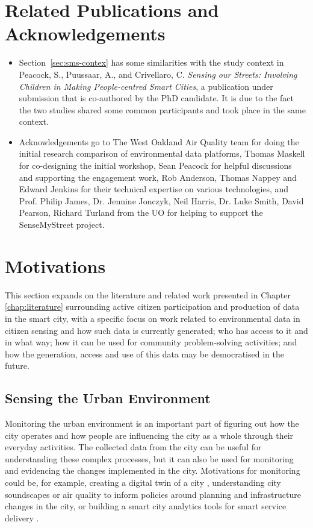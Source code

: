 \section*{Related Publications and Acknowledgements}
\begin{itemize}
\item Section~\ref{sec:sms-contex} has some similarities with the study context in Peacock, S., Puussaar, A., and Crivellaro, C. \textit{Sensing our Streets: Involving Children in Making People-centred Smart Cities}, a publication under submission that is co-authored by the PhD candidate. It is due to the fact the two studies shared some common participants and took place in the same context.
\item Acknowledgements go to The West Oakland Air Quality team for doing the initial research comparison of environmental data platforms, Thomas Maskell for co-designing the initial workshop, Sean Peacock for helpful discussions and supporting the engagement work, Rob Anderson, Thomas Nappey and Edward Jenkins for their technical expertise on various technologies, and Prof. Philip James, Dr. Jennine Jonczyk, Neil Harris, Dr. Luke Smith, David Pearson, Richard Turland from the UO for helping to support the SenseMyStreet project.
\end{itemize}
\clearpage

\section{Motivations}
\label{sec:sms_mod}
This section expands on the literature and related work presented in Chapter \ref{chap:literature} surrounding active citizen participation and production of data in the smart city, with a specific focus on work related to environmental data in citizen sensing and how such data is currently generated; who has access to it and in what way; how it can be used for community problem-solving activities; and how the generation, access and use of this data may be democratised in the future.

\subsection{Sensing the Urban Environment}
Monitoring the urban environment is an important part of figuring out how the city operates and how people are influencing the city as a whole through their everyday activities. The collected data from the city can be useful for understanding these complex processes, but it can also be used for monitoring and evidencing the changes implemented in the city. Motivations for monitoring could be, for example, creating a digital twin of a city \citep{bolton_gemini_2018}, understanding city soundscapes \citep{adams_sustainable_2006} or air quality \citep{department_for_environment_air_2018} to inform policies around planning and infrastructure changes in the city, or building a smart city analytics tools for smart service delivery \citep{puiu_citypulse:_2016}.

